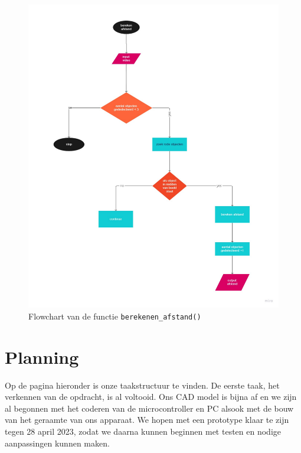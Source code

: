 \documentclass[kulak]{kulakarticle} %
\begin{document}
\begin{figure} [!h]
	\centering
	\includegraphics[width = 0.8 \textwidth]{flowchart afstand berekenen.pdf}
\cprotect\caption{Flowchart van de functie \verb*|berekenen_afstand()|}
\end{figure}
 


\section{Planning}
Op de pagina hieronder is onze taakstructuur te vinden. De eerste taak, het verkennen van de opdracht, is al voltooid. Ons CAD model is bijna af en we zijn al begonnen met het coderen van de microcontroller en PC alsook met de bouw van het geraamte van ons apparaat. We hopen met een prototype klaar te zijn tegen 28 april 2023, zodat we daarna kunnen beginnen met testen en nodige aanpassingen kunnen maken.

\end{document}
